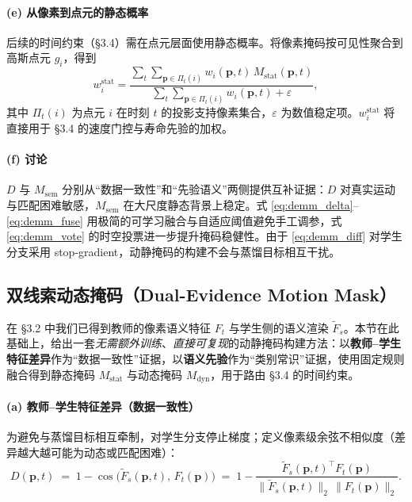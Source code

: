 \documentclass[10pt,conference]{IEEEtran} %
\begin{document}
\paragraph{(e) 从像素到点元的静态概率}
后续的时间约束（§3.4）需在点元层面使用静态概率。将像素掩码按可见性聚合到高斯点元 $g_i$，得到
\begin{equation}
w_i^{\mathrm{stat}}=
\frac{\sum_{t}\sum_{\mathbf p\in\Pi_t(i)} w_i(\mathbf p,t)\,M_{\mathrm{stat}}(\mathbf p,t)}
{\sum_{t}\sum_{\mathbf p\in\Pi_t(i)} w_i(\mathbf p,t)+\varepsilon},
\label{eq:demm_pointstat}
\end{equation}
其中 $\Pi_t(i)$ 为点元 $i$ 在时刻 $t$ 的投影支持像素集合，$\varepsilon$ 为数值稳定项。$w_i^{\mathrm{stat}}$ 将直接用于 §3.4 的速度门控与寿命先验的加权。

\paragraph{(f) 讨论}
$D$ 与 $M_{\mathrm{sem}}$ 分别从“数据一致性”和“先验语义”两侧提供互补证据：$D$ 对真实运动与匹配困难敏感，$M_{\mathrm{sem}}$ 在大尺度静态背景上稳定。式 \eqref{eq:demm_delta}--\eqref{eq:demm_fuse} 用极简的可学习融合与自适应阈值避免手工调参，式 \eqref{eq:demm_vote} 的时空投票进一步提升掩码稳健性。由于 \eqref{eq:demm_diff} 对学生分支采用 stop-gradient，动静掩码的构建不会与蒸馏目标相互干扰。


\subsection{双线索动态掩码（Dual-Evidence Motion Mask）}
在 §3.2 中我们已得到教师的像素语义特征 $F_t$ 与学生侧的语义渲染 $\tilde F_s$。本节在此基础上，给出一套\emph{无需额外训练}、\emph{直接可复现}的动静掩码构建方法：以\textbf{教师--学生特征差异}作为“数据一致性”证据，以\textbf{语义先验}作为“类别常识”证据，使用固定规则融合得到静态掩码 $M_{\mathrm{stat}}$ 与动态掩码 $M_{\mathrm{dyn}}$，用于路由 §3.4 的时间约束。

\paragraph{(a) 教师--学生特征差异（数据一致性）}
为避免与蒸馏目标相互牵制，对学生分支停止梯度；定义像素级余弦不相似度（差异越大越可能为动态或匹配困难）：
\begin{equation}
D(\mathbf p,t)\;=\;1-\cos\!\big(\tilde F_s(\mathbf p,t),\,F_t(\mathbf p)\big)
\;=\;1-\frac{\tilde F_s(\mathbf p,t)^{\top} F_t(\mathbf p)}
{\big\|\tilde F_s(\mathbf p,t)\big\|_2\,\big\|F_t(\mathbf p)\big\|_2}.
\end{equation}
\end{document}
